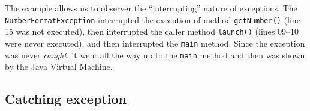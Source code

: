 The example allows us to observer the ``interrupting'' nature of
exceptions. The \verb+NumberFormatException+ interrupted the execution
of method \verb+getNumber()+ (line 15 was not executed), then
interrupted the caller method \verb+launch()+ (lines 09--10 were never
executed), and then interrupted the \verb+main+ method. Since the
exception was never \emph{caught}, it went all the way up to the
\verb+main+ method and then was shown by the Java Virtual Machine. 

\subsection{Catching exception}
\label{sec:catching-exception}


















